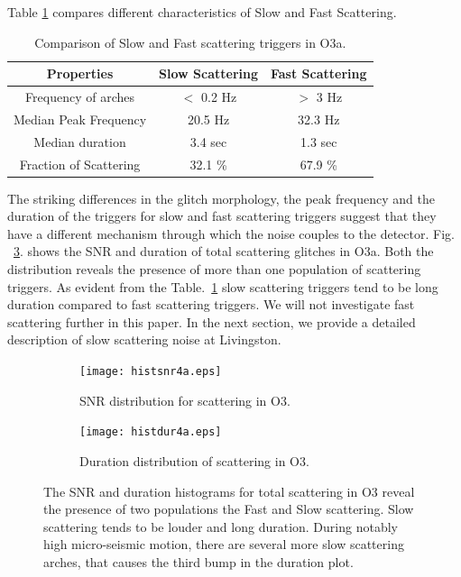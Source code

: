 \documentclass[12pt]{iopart}
\begin{document}
Table \ref{tab:fastslowtab} compares different characteristics of Slow and Fast Scattering.
\begin{table}[h]
    \centering
    \begin{tabular}{c|c|c}
    \hline
      \textbf{Properties}   &  \textbf{Slow Scattering} & 
      \textbf{Fast Scattering}\\
      \hline
       Frequency of arches  & $<$ 0.2 Hz & $>$ 3 Hz \\
      \hline
      Median Peak Frequency & 20.5 Hz & 32.3 Hz \\
      \hline
      Median duration & 3.4 sec & 1.3 sec \\
      \hline
      Fraction of Scattering & 32.1 \% & 67.9 \% \\
       
    \hline
    \end{tabular}
    \caption{Comparison of Slow and Fast scattering triggers in O3a.}
    \label{tab:fastslowtab}
\end{table}{}


The striking differences in the glitch morphology, the peak frequency and the duration of the triggers for slow and fast scattering triggers suggest that they have a different mechanism through which the noise couples to the detector. Fig. ~\ref{fig:snrdur}. shows the SNR and duration of total scattering glitches in O3a. Both the distribution reveals the presence of more than one population of scattering triggers. As evident from the Table.~\ref{tab:fastslowtab} slow scattering triggers tend to be long duration compared to fast scattering triggers. We will not investigate fast scattering further in this paper. In the next section, we provide a detailed description of slow scattering noise at Livingston.
\begin{figure}[h]
   \centering
    \begin{subfigure}[b]{0.45\textwidth}
        \centering
         \texttt{[image: histsnr4a.eps]}
         \caption{SNR distribution for scattering in O3.}
         \label{fig:histsnr}
    \end{subfigure}
    \hfill
    \begin{subfigure}[b]{0.5\textwidth}
        \centering
         \texttt{[image: histdur4a.eps]}
         \caption{{\small Duration distribution of scattering in O3.}}
         \label{fig:histdur}
         
    
    \end{subfigure}
    \caption{The SNR and duration histograms for total scattering in O3 reveal the presence of two populations the Fast and Slow scattering. Slow scattering tends to be louder and long duration. During notably high micro-seismic motion, there are several more slow scattering arches, that causes the third bump in the duration plot.}
    \label{fig:snrdur}
    
\end{figure}
\end{document}
